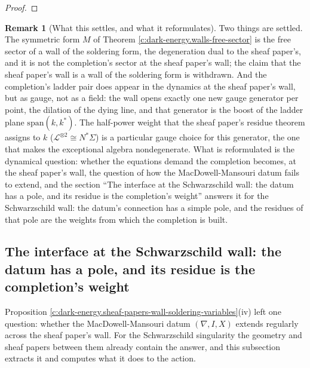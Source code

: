 \documentclass[11pt]{article}
\theoremstyle{definition}
\newtheorem{remark}[theorem]{Remark}
\theoremstyle{plain}
\begin{document}
\begin{proof}
\end{proof}

\begin{remark}[What this settles, and what it reformulates]\label{c:note.dark-energy.what-settles-what-it-reformulates}
Two things are settled. The symmetric form $M$ of Theorem \ref{c:dark-energy.walls-free-sector} is the free sector of a wall of the soldering form, the degeneration dual to the sheaf paper's, and it is not the completion's sector at the sheaf paper's wall; the claim that the sheaf paper's wall is a wall of the soldering form is withdrawn. And the completion's ladder pair does appear in the dynamics at the sheaf paper's wall, but as gauge, not as a field: the wall opens exactly one new gauge generator per point, the dilation of the dying line, and that generator is the boost of the ladder plane $\mathrm{span}(k, k^*)$. The half-power weight that the sheaf paper's residue theorem assigns to $k$ ($\mathcal{L}^{\otimes 2} \cong N^*\Sigma$) is a particular gauge choice for this generator, the one that makes the exceptional algebra nondegenerate. What is reformulated is the dynamical question: whether the equations demand the completion becomes, at the sheaf paper's wall, the question of how the MacDowell-Mansouri datum fails to extend, and the section ``The interface at the Schwarzschild wall: the datum has a pole, and its residue is the completion's weight'' answers it for the Schwarzschild wall: the datum's connection has a simple pole, and the residues of that pole are the weights from which the completion is built.
\end{remark}

\subsection*{The interface at the Schwarzschild wall: the datum has a pole, and its residue is the completion's weight}
\label{c:note.dark-energy.setting-interface-schwarzschild-wall-datum-has}
Proposition \ref{c:dark-energy.sheaf-papers-wall-soldering-variables}(iv) left one question: whether the MacDowell-Mansouri datum $(\nabla, I, X)$ extends regularly across the sheaf paper's wall. For the Schwarzschild singularity the geometry and sheaf papers between them already contain the answer, and this subsection extracts it and computes what it does to the action.
\end{document}
